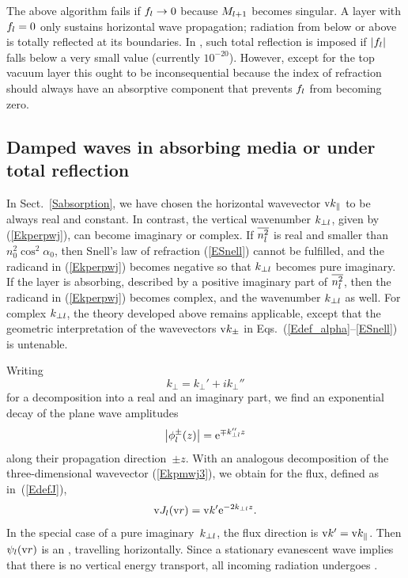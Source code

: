 The above algorithm fails if $f_{l}\to0$
because $M_{l+1}$ becomes singular.
A layer with $f_{l}=0$ only sustains horizontal wave propagation;
radiation from below or above is totally reflected at its boundaries.
In \BornAgain,
such total reflection is imposed if $|f_{l}|$ falls below a very small value
(currently $10^{-20}$).
However, except for the top vacuum layer
this ought to be inconsequential
because the index of refraction should always
have an absorptive component that prevents $f_{l}$ from becoming zero.


\subsection{Damped waves in absorbing media or under total reflection}
  \label{Smulayabs}

In Sect.~\ref{Sabsorption},
we have chosen the horizontal wavevector $\text{v}{k}_{\parallel}$
to be always real and constant.
In contrast, the vertical wavenumber $k_{\perp l}$,
given by (\ref{Ekperpwj}),
can become imaginary or complex.
If $\overline{n_l^2}$ is real and smaller than~$n_0^2\cos^2\alpha_0$,
then Snell's law of refraction (\ref{ESnell}) cannot be fulfilled,
and the radicand in (\ref{Ekperpwj}) becomes negative
so that $k_{\perp l}$ becomes pure imaginary.
%
If the layer is absorbing,
described by a positive imaginary part of $\overline{n_l^2}$,
then the radicand in (\ref{Ekperpwj}) becomes complex,
and the wavenumber $k_{\perp l}$ as well.
For complex $k_{\perp l}$,
the theory developed above remains applicable,
except that the geometric interpretation of the wavevectors $\text{v}{k}_\pm$
in Eqs.~(\ref{Edef_alpha}--\ref{ESnell}) is untenable.

Writing
\begin{equation}
  k_\perp = k_\perp' + i k_\perp''
\end{equation}
for a decomposition into a real and an imaginary part,
we find an exponential decay of the plane wave amplitudes
\begin{equation}\label{Ephidamp}
  \left|\phi^\pm_l(z)\right|
  = \text{e}^{\mp k_{\perp l}'' z}
\end{equation}
along their propagation direction~$\pm z$.
With an analogous decomposition
of the three-dimensional wavevector (\ref{Ekpmwj3}),
we obtain for the flux, defined as in~(\ref{EdefJ}),
\begin{equation}
  \text{v}{J}_l(\text{v}{r}) = \text{v}{k}' \text{e}^{-2k_{\perp l}z}.
\end{equation}
In the special case of a pure imaginary~$k_{\perp l}$,
the flux direction is $\text{v}{k}'=\text{v}{k}_\parallel$.
Then $\psi_l(\text{v}{r})$ is an ,
%
travelling horizontally.
Since a stationary evanescent wave implies that there is
no vertical energy transport,
all incoming radiation undergoes .
%

